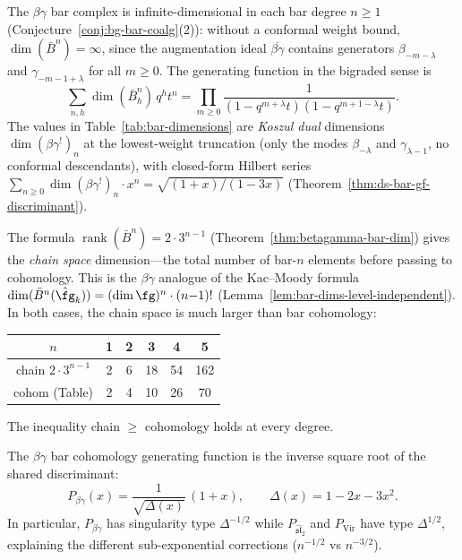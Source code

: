 \begin{remark}\label{rem:betagamma-conventions}
The $\beta\gamma$ bar complex is infinite-dimensional in each bar
degree $n \geq 1$ (Conjecture~\ref{conj:bg-bar-coalg}(2)):
without a conformal weight bound,
$\dim(\bar{B}^n) = \infty$, since the augmentation ideal
$\overline{\beta\gamma}$ contains generators $\beta_{-m-\lambda}$
and $\gamma_{-m-1+\lambda}$ for all $m \geq 0$.
The generating function in the bigraded sense is
\[
\sum_{n,h} \dim(\bar{B}^n_h)\, q^h t^n
= \prod_{m \geq 0}
  \frac{1}{(1-q^{m+\lambda}t)(1-q^{m+1-\lambda}t)}.
\]
The values in Table~\ref{tab:bar-dimensions}
are \emph{Koszul dual} dimensions $\dim (\beta\gamma^!)_n$
at the lowest-weight truncation (only the modes
$\beta_{-\lambda}$ and $\gamma_{\lambda-1}$, no conformal descendants),
with closed-form Hilbert series
$\sum_{n \geq 0} \dim (\beta\gamma^!)_n \cdot x^n = \sqrt{(1{+}x)/(1{-}3x)}$
(Theorem~\ref{thm:ds-bar-gf-discriminant}).

The formula $\operatorname{rank}(\bar{B}^n) = 2 \cdot 3^{n-1}$
(Theorem~\ref{thm:betagamma-bar-dim}) gives the \emph{chain space}
dimension---the total number of bar-$n$ elements before passing to
cohomology.  This is the $\beta\gamma$ analogue of the Kac--Moody
formula $\dim(\bar{B}^n(\hat{\fg}_k)) = (\dim\fg)^n \cdot (n{-}1)!$
(Lemma~\ref{lem:bar-dims-level-independent}).  In both cases,
the chain space is much larger than bar cohomology:
\begin{center}
\begin{tabular}{c|ccccc}
$n$ & 1 & 2 & 3 & 4 & 5 \\
\hline
chain $2 \cdot 3^{n-1}$ & 2 & 6 & 18 & 54 & 162 \\
cohom (Table) & 2 & 4 & 10 & 26 & 70
\end{tabular}
\end{center}
The inequality chain $\geq$ cohomology holds at every degree.
\end{remark}

\begin{corollary}
\label{cor:betagamma-inverse-discriminant}
The $\beta\gamma$ bar cohomology generating function is the inverse square root of the shared discriminant:
\[
P_{\beta\gamma}(x) = \frac{1}{\sqrt{\Delta(x)}}\,(1+x),
\qquad \Delta(x) = 1-2x-3x^2.
\]
In particular, $P_{\beta\gamma}$ has singularity type $\Delta^{-1/2}$ while $P_{\widehat{\mathfrak{sl}}_2}$ and $P_{\mathrm{Vir}}$ have type $\Delta^{1/2}$, explaining the different sub-exponential corrections ($n^{-1/2}$ vs $n^{-3/2}$).
\end{corollary}

